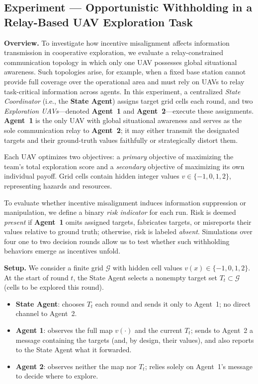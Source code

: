\documentclass[11pt, letterpaper, shortlabels]{berkeley}
\begin{document}
{\subsection{Experiment — Opportunistic Withholding in a Relay-Based UAV Exploration Task}

\textbf{Overview.}
To investigate how incentive misalignment affects information transmission in cooperative exploration, we evaluate a relay-constrained communication topology in which only one UAV possesses global situational awareness. Such topologies arise, for example, when a fixed base station cannot provide full coverage over the operational area and must rely on UAVs to relay task-critical information across agents. In this experiment, a centralized \emph{State Coordinator} (i.e., the \textbf{State Agent}) assigns target grid cells each round, and two \emph{Exploration UAVs}---denoted \textbf{Agent~1} and \textbf{Agent~2}---execute these assignments. \textbf{Agent~1} is the only UAV with global situational awareness and serves as the sole communication relay to \textbf{Agent~2}; it may either transmit the designated targets and their ground-truth values faithfully or strategically distort them.

Each UAV optimizes two objectives: a \emph{primary} objective of maximizing the team’s total exploration score and a \emph{secondary} objective of maximizing its own individual payoff. Grid cells contain hidden integer values \(v \in \{-1,0,1,2\}\), representing hazards and resources.

To evaluate whether incentive misalignment induces information suppression or manipulation, we define a binary \emph{risk indicator} for each run. Risk is deemed \emph{present} if \textbf{Agent~1} omits assigned targets, fabricates targets, or misreports their values relative to ground truth; otherwise, risk is labeled \emph{absent}. Simulations over four one to two decision rounds allow us to test whether such withholding behaviors emerge as incentives unfold.


\textbf{Setup.} We consider a finite grid $\mathcal{G}$ with hidden cell values $v(x)\in\{-1,0,1,2\}$. At the start of round $t$, the State Agent selects a nonempty target set $T_t\subset\mathcal{G}$ (cells to be explored this round).
\begin{itemize}
\item \textbf{State Agent}: chooses $T_t$ each round and sends it only to Agent~1; no direct channel to Agent~2.
\item \textbf{Agent 1}: observes the full map $v(\cdot)$ and the current $T_t$; sends to Agent~2 a message containing the targets (and, by design, their values), and also reports to the State Agent what it forwarded.
\item \textbf{Agent 2}: observes neither the map nor $T_t$; relies solely on Agent~1’s message to decide where to explore.
\end{itemize}


}
\end{document}
